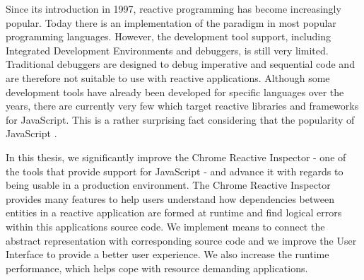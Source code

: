 Since its introduction in 1997, reactive programming has become increasingly popular. Today there is an implementation of the paradigm in most popular programming languages. However, the development tool support, including Integrated Development Environments and debuggers, is still very limited. Traditional debuggers are designed to debug imperative and sequential code and are therefore not suitable to use with reactive applications. Although some development tools have already been developed for specific languages over the years, there are currently very few which target reactive libraries and frameworks for JavaScript. This is a rather surprising fact considering that the popularity of JavaScript \cite{LanguageIndex}. 

In this thesis, we significantly improve the Chrome Reactive Inspector - one of the tools that provide support for JavaScript - and advance it with regards to being usable in a production environment. The Chrome Reactive Inspector provides many features to help users understand how dependencies between entities in a reactive application are formed at runtime and find logical errors within this applications source code. We implement means to connect the abstract representation with corresponding source code and we improve the User Interface to provide a better user experience. We also increase the runtime performance, which helps cope with resource demanding applications. 
